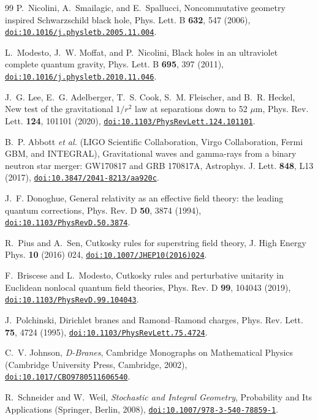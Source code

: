 \documentclass[aps,prd,10pt,twocolumn,superscriptaddress,nofootinbib,floatfix,longbibliography,showpacs,showkeys]{revtex4-2}
\theoremstyle{plain}
\theoremstyle{definition}
\theoremstyle{remark}
\begin{document}
\begin{thebibliography}{99}
P.~Nicolini, A.~Smailagic, and E.~Spallucci, Noncommutative geometry inspired Schwarzschild black hole, Phys. Lett. B \textbf{632}, 547 (2006), \href{https://doi.org/10.1016/j.physletb.2005.11.004}{\nolinkurl{doi:10.1016/j.physletb.2005.11.004}}.

L.~Modesto, J.~W. Moffat, and P.~Nicolini, Black holes in an ultraviolet complete quantum gravity, Phys. Lett. B \textbf{695}, 397 (2011), \href{https://doi.org/10.1016/j.physletb.2010.11.046}{\nolinkurl{doi:10.1016/j.physletb.2010.11.046}}.

J.~G. Lee, E.~G. Adelberger, T.~S. Cook, S.~M. Fleischer, and B.~R. Heckel, New test of the gravitational $1/r^2$ law at separations down to 52 $\mu$m, Phys. Rev. Lett. \textbf{124}, 101101 (2020), \href{https://doi.org/10.1103/PhysRevLett.124.101101}{\nolinkurl{doi:10.1103/PhysRevLett.124.101101}}.

B.~P. Abbott \emph{et al.} (LIGO Scientific Collaboration, Virgo Collaboration, Fermi GBM, and INTEGRAL), Gravitational waves and gamma-rays from a binary neutron star merger: GW170817 and GRB 170817A, Astrophys. J. Lett. \textbf{848}, L13 (2017), \href{https://doi.org/10.3847/2041-8213/aa920c}{\nolinkurl{doi:10.3847/2041-8213/aa920c}}.

J.~F. Donoghue, General relativity as an effective field theory: the leading quantum corrections, Phys. Rev. D \textbf{50}, 3874 (1994), \href{https://doi.org/10.1103/PhysRevD.50.3874}{\nolinkurl{doi:10.1103/PhysRevD.50.3874}}.

R.~Pius and A.~Sen, Cutkosky rules for superstring field theory, J. High Energy Phys. \textbf{10} (2016) 024, \href{https://doi.org/10.1007/JHEP10(2016)024}{\nolinkurl{doi:10.1007/JHEP10(2016)024}}.

F.~Briscese and L.~Modesto, Cutkosky rules and perturbative unitarity in Euclidean nonlocal quantum field theories, Phys. Rev. D \textbf{99}, 104043 (2019), \href{https://doi.org/10.1103/PhysRevD.99.104043}{\nolinkurl{doi:10.1103/PhysRevD.99.104043}}.

J.~Polchinski, Dirichlet branes and Ramond--Ramond charges, Phys. Rev. Lett. \textbf{75}, 4724 (1995), \href{https://doi.org/10.1103/PhysRevLett.75.4724}{\nolinkurl{doi:10.1103/PhysRevLett.75.4724}}.

C.~V. Johnson, \emph{D-Branes}, Cambridge Monographs on Mathematical Physics (Cambridge University Press, Cambridge, 2002), \href{https://doi.org/10.1017/CBO9780511606540}{\nolinkurl{doi:10.1017/CBO9780511606540}}.

R.~Schneider and W.~Weil, \emph{Stochastic and Integral Geometry}, Probability and Its Applications (Springer, Berlin, 2008), \href{https://doi.org/10.1007/978-3-540-78859-1}{\nolinkurl{doi:10.1007/978-3-540-78859-1}}.

\end{thebibliography}
\end{document}
